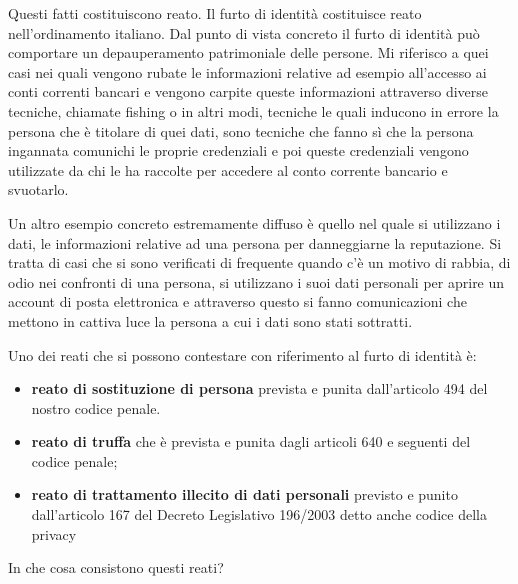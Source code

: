 Questi fatti costituiscono reato. Il furto di identità costituisce reato nell'ordinamento italiano. Dal punto di vista concreto il furto di identità può comportare un depauperamento patrimoniale delle persone. Mi riferisco a quei casi nei quali vengono rubate le informazioni relative ad esempio all'accesso ai conti correnti bancari e vengono carpite queste informazioni attraverso diverse tecniche, chiamate fishing o in altri modi, tecniche le quali inducono in errore la persona che è titolare di quei dati, sono tecniche che fanno sì che la persona ingannata comunichi le proprie credenziali e poi queste credenziali vengono utilizzate da chi le ha raccolte per accedere al conto corrente bancario e svuotarlo.

Un altro esempio concreto estremamente diffuso è quello nel quale si utilizzano i dati, le informazioni relative ad una persona per danneggiarne la reputazione. Si tratta di casi che si sono verificati di frequente quando c'è un motivo di rabbia, di odio nei confronti di una persona, si utilizzano i suoi dati personali per aprire un account di posta elettronica e attraverso questo si fanno comunicazioni che mettono in cattiva luce la persona a cui i dati sono stati sottratti.

Uno dei reati che si possono contestare con riferimento al furto di identità è:

\begin{itemize}
    \item \textbf{reato di sostituzione di persona} prevista e punita dall'articolo 494 del nostro codice penale. 
    \item \textbf{reato di truffa} che è prevista e punita dagli articoli 640 e seguenti del codice penale;
    \item \textbf{reato di trattamento illecito di dati personali} previsto e punito dall'articolo 167 del Decreto Legislativo 196/2003 detto anche codice della privacy
\end{itemize}

In che cosa consistono questi reati?

